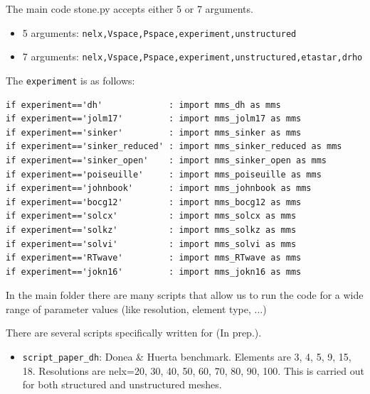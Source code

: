 The main code {\pythonfile stone.py} accepts either 5 or 7 arguments.

\begin{itemize}
\item 5 arguments: \lstinline{nelx,Vspace,Pspace,experiment,unstructured}
\item 7 arguments: \lstinline{nelx,Vspace,Pspace,experiment,unstructured,etastar,drho}
\end{itemize} 

The \lstinline{experiment} is as follows:
\begin{lstlisting}
if experiment=='dh'             : import mms_dh as mms
if experiment=='jolm17'         : import mms_jolm17 as mms
if experiment=='sinker'         : import mms_sinker as mms
if experiment=='sinker_reduced' : import mms_sinker_reduced as mms
if experiment=='sinker_open'    : import mms_sinker_open as mms
if experiment=='poiseuille'     : import mms_poiseuille as mms
if experiment=='johnbook'       : import mms_johnbook as mms
if experiment=='bocg12'         : import mms_bocg12 as mms
if experiment=='solcx'          : import mms_solcx as mms
if experiment=='solkz'          : import mms_solkz as mms
if experiment=='solvi'          : import mms_solvi as mms
if experiment=='RTwave'         : import mms_RTwave as mms
if experiment=='jokn16'         : import mms_jokn16 as mms
\end{lstlisting}

In the main folder there are many scripts that allow us to run the code
for a wide range of parameter values (like resolution, element type, ...)

There are several scripts specifically written for 
\textcite{thba24} (In prep.).
\begin{itemize}
\item {\tt script\_paper\_dh}: Donea \& Huerta benchmark.
Elements are 3, 4, 5, 9, 15, 18. 
Resolutions are nelx=20, 30, 40, 50, 60, 70, 80, 90, 100.
This is carried out for both structured and unstructured meshes.
\end{itemize}

